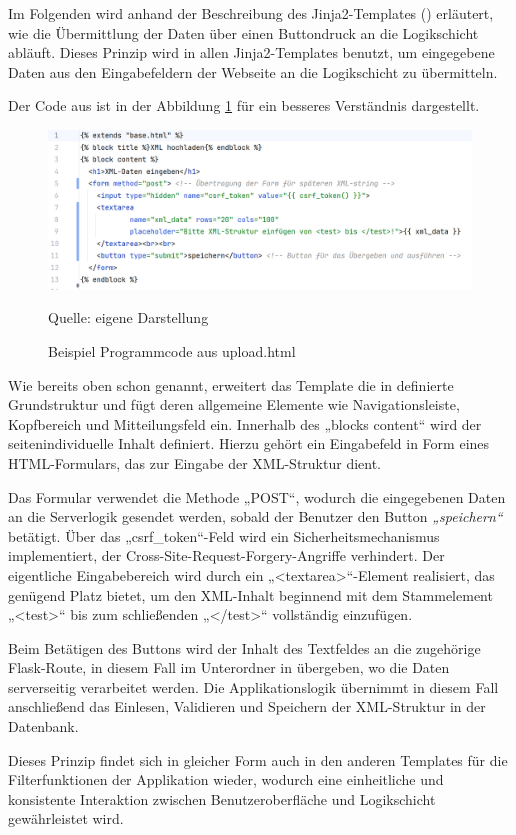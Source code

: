 Im Folgenden wird anhand der Beschreibung des
Jinja2-Templates () erläutert, wie die Übermittlung der Daten
über einen Buttondruck an die Logikschicht abläuft. Dieses Prinzip wird in
allen Jinja2-Templates benutzt, um eingegebene Daten aus den Eingabefeldern der
Webseite an die Logikschicht zu übermitteln.


Der Code aus  ist in der Abbildung \ref{fig: Programmcode aus upload.html} für ein besseres Verständnis dargestellt.

\begin{figure}[H]
    \centering
    \includegraphics[width=1\textwidth]{Grafiken/Beispiel Programmcode aus upload.html}
    \caption{Beispiel Programmcode aus upload.html}
    \label{fig: Programmcode aus upload.html}
    {Quelle: eigene Darstellung}
\end{figure}

Wie bereits oben schon genannt, erweitert das Template  die
in  definierte Grundstruktur und fügt deren allgemeine Elemente
wie Navigationsleiste, Kopfbereich und Mitteilungsfeld ein. Innerhalb des „blocks
content“ wird der seitenindividuelle Inhalt definiert. Hierzu gehört ein
Eingabefeld in Form eines HTML-Formulars, das zur Eingabe der XML-Struktur
dient.

Das Formular verwendet die Methode „POST“, wodurch die
eingegebenen Daten an die Serverlogik gesendet werden, sobald der Benutzer den
Button \textit{„speichern“} betätigt. Über das „csrf\_token“-Feld wird ein
Sicherheitsmechanismus implementiert, der Cross-Site-Request-Forgery-Angriffe
verhindert. Der eigentliche Eingabebereich wird durch ein „<textarea>“-Element
realisiert, das genügend Platz bietet, um den XML-Inhalt beginnend mit dem
Stammelement „<test>“ bis zum schließenden „</test>“ vollständig
einzufügen.

Beim Betätigen des Buttons wird der Inhalt des Textfeldes an
die zugehörige Flask-Route, in diesem Fall  im Unterordner 
in  übergeben, wo die Daten serverseitig verarbeitet werden.
Die Applikationslogik übernimmt in diesem Fall anschließend das Einlesen, Validieren und Speichern der XML-Struktur in der Datenbank.

Dieses Prinzip findet sich in gleicher Form auch in den
anderen Templates für die Filterfunktionen der Applikation wieder, wodurch eine einheitliche und
konsistente Interaktion zwischen Benutzeroberfläche und Logikschicht
gewährleistet wird.



























